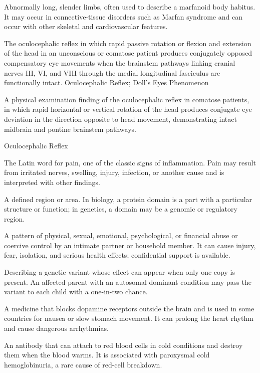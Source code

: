  Abnormally long, slender limbs, often used to describe a marfanoid body habitus. It may occur in connective-tissue disorders such as Marfan syndrome and can occur with other skeletal and cardiovascular features.

 The oculocephalic reflex in which rapid passive rotation or flexion and extension of the head in an unconscious or comatose patient produces conjugately opposed compensatory eye movements when the brainstem pathways linking cranial nerves III, VI, and VIII through the medial longitudinal fasciculus are functionally intact.
\synonyms
Oculocephalic Reflex; Doll's Eyes Phenomenon

 A physical examination finding of the oculocephalic reflex in comatose patients, in which rapid horizontal or vertical rotation of the head produces conjugate eye deviation in the direction opposite to head movement, demonstrating intact midbrain and pontine brainstem pathways.

\synonyms
Oculocephalic Reflex

 The Latin word for pain, one of the classic signs of inflammation. Pain may result from irritated nerves, swelling, injury, infection, or another cause and is interpreted with other findings.

 A defined region or area. In biology, a protein domain is a part with a particular structure or function; in genetics, a domain may be a genomic or regulatory region.

 A pattern of physical, sexual, emotional, psychological, or financial abuse or coercive control by an intimate partner or household member. It can cause injury, fear, isolation, and serious health effects; confidential support is available.

 Describing a genetic variant whose effect can appear when only one copy is present. An affected parent with an autosomal dominant condition may pass the variant to each child with a one-in-two chance.

 A medicine that blocks dopamine receptors outside the brain and is used in some countries for nausea or slow stomach movement. It can prolong the heart rhythm and cause dangerous arrhythmias.

 An antibody that can attach to red blood cells in cold conditions and destroy them when the blood warms. It is associated with paroxysmal cold hemoglobinuria, a rare cause of red-cell breakdown.

